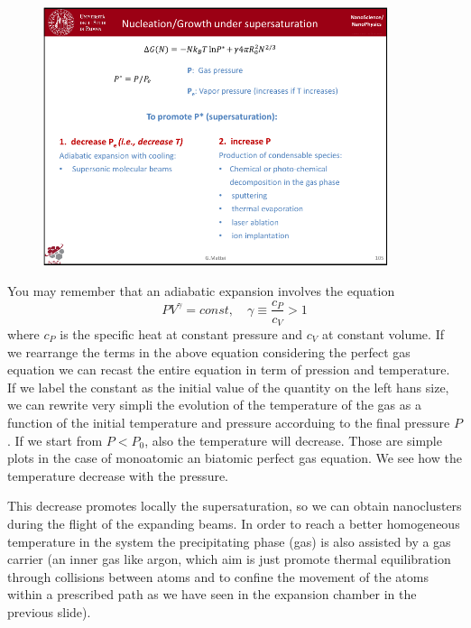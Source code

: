 \documentclass[../main/main.tex]{subfiles}
\begin{document}
\begin{figure}[h!]
\centering
\includegraphics[page=3,width=0.9\textwidth]{../lessons/pdf_file/7_lesson.pdf}
\end{figure}

You may remember that an adiabatic expansion involves the equation
\begin{equation*}
  P V^ \gamma = const, \quad \gamma \equiv \frac{c_P}{c_V}  >1
\end{equation*}
 where \( c_P \) is the specific heat at constant pressure and \( c_V \) at constant volume. If we rearrange the terms in the above equation considering the perfect gas equation we can recast the entire equation in term of pression and temperature. If we label the constant as the initial value of the quantity on the left hans size, we can rewrite very simpli the evolution of the temperature of the gas as a function of the initial temperature and pressure accorduing to the final pressure \( P \). If we start from \( P < P_0 \), also the temperature will decrease. Those are simple plots in the case of monoatomic an biatomic perfect gas equation. We see how the temperature decrease with the pressure.

 This decrease promotes locally the supersaturation, so we can obtain nanoclusters during the flight of the expanding beams. In order to reach a better homogeneous temperature in the system the precipitating phase  (gas) is also assisted by a gas carrier (an inner gas like argon, which aim is just promote thermal equilibration through collisions between atoms and to confine the movement of the atoms within a prescribed path as we have seen in the expansion chamber in the previous slide).
\end{document}

